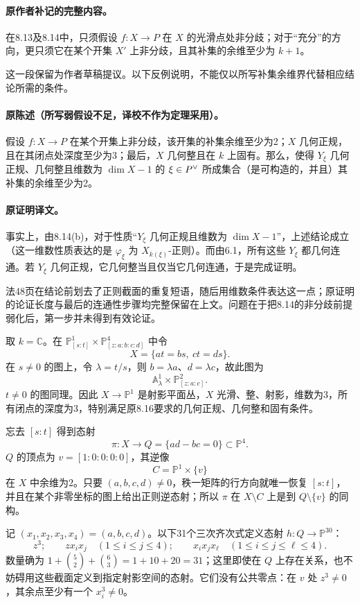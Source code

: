 \paragraph{原作者补记的完整内容。}
在8.13及8.14中，只须假设 $f:X\to P$ 在 $X$ 的光滑点处非分歧；对于“充分”的方向，更只须它在某个开集 $X'$ 上非分歧，且其补集的余维至少为 $k+1$。

这一段保留为作者草稿提议。以下反例说明，不能仅以所写补集余维界代替相应结论所需的条件。

\paragraph{原陈述（所写弱假设不足，译校不作为定理采用）。}
假设 $f:X\to P$ 在某个开集上非分歧，该开集的补集余维至少为2；$X$ 几何正规，且在其闭点处深度至少为3；最后，$X$ 几何整且在 $k$ 上固有。那么，使得 $Y_\xi$ 几何正规、几何整且维数为 $\dim X-1$ 的 $\xi\in P^\vee$ 所成集合（是可构造的，并且）其补集的余维至少为2。

\paragraph{原证明译文。}
事实上，由8.14(b)，对于性质“$Y_\xi$ 几何正规且维数为 $\dim X-1$”，上述结论成立（这一维数性质表达的是 $\varphi_\xi$ 为 $X_{k(\xi)}$-正则）。而由6.1，所有这些 $Y_\xi$ 都几何连通。若 $Y_\xi$ 几何正规，它几何整当且仅当它几何连通，于是完成证明。

法48页在结论前划去了正则截面的重复短语，随后用维数条件表达这一点；原证明的论证长度与最后的连通性步骤均完整保留在上文。问题在于把8.14的非分歧前提弱化后，第一步并未得到有效论证。

取 $k=\mathbb C$。在 $\mathbb P^1_{[s:t]}\times\mathbb P^4_{[z:a:b:c:d]}$ 中令
\[
 X=\{at=bs,\ ct=ds\}.
\]
在 $s\ne0$ 的图上，令 $\lambda=t/s$，则 $b=\lambda a$、$d=\lambda c$，故此图为
\[
 \mathbb A^1_\lambda\times\mathbb P^2_{[z:a:c]}.
\]
$t\ne0$ 的图同理。因此 $X\to\mathbb P^1$ 是射影平面丛，$X$ 光滑、整、射影，维数为3，所有闭点的深度为3，特别满足原8.16要求的几何正规、几何整和固有条件。

忘去 $[s:t]$ 得到态射
\[
 \pi:X\longrightarrow Q=\{ad-bc=0\}\subset\mathbb P^4.
\]
$Q$ 的顶点为 $v=[1:0:0:0:0]$，其逆像
\[
 C=\mathbb P^1\times\{v\}
\]
在 $X$ 中余维为2。只要 $(a,b,c,d)\ne0$，秩一矩阵的行方向就唯一恢复 $[s:t]$，并且在某个非零坐标的图上给出正则逆态射；所以 $\pi$ 在 $X\setminus C$ 上是到 $Q\setminus\{v\}$ 的同构。

记 $(x_1,x_2,x_3,x_4)=(a,b,c,d)$。以下31个三次齐次式定义态射 $h:Q\to\mathbb P^{30}$：
\[
 z^3;\qquad
 z x_i x_j\quad(1\le i\le j\le4);\qquad
 x_i x_j x_\ell\quad(1\le i\le j\le\ell\le4).
\]
数量确为 $1+\binom52+\binom63=1+10+20=31$；这里即使在 $Q$ 上存在关系，也不妨碍用这些截面定义到指定射影空间的态射。它们没有公共零点：在 $v$ 处 $z^3\ne0$，其余点至少有一个 $x_i^3\ne0$。

